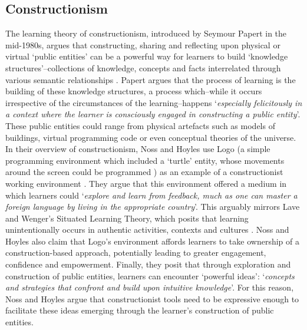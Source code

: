 \documentclass{sigchi}
\begin{document}
\subsection{Constructionism}
The learning theory of constructionism, introduced by Seymour Papert in the mid-1980s, argues that constructing, sharing and reflecting upon physical or virtual `public entities' can be a powerful way for learners to build `knowledge structures'--collections of knowledge, concepts and facts interrelated through various semantic relationships \cite{PapertSeymourandHarel1991a}. Papert argues that the process of learning is the building of these knowledge structures, a process which--while it occurs irrespective of the circumstances of the learning--happens `\textit{especially felicitously in a context where the learner is consciously engaged in constructing a public entity}'. These public entities could range from physical artefacts such as models of buildings, virtual programming code or even conceptual theories of the universe. In their overview of constructionism, Noss and Hoyles use Logo (a simple programming environment which included a `turtle' entity, whose movements around the screen could be programmed \cite{Harvey1997}) as an example of a constructionist working environment \cite{Noss2017}. They argue that this environment offered a medium in which learners could `\textit{explore and learn from feedback, much as one can master a foreign language by living in the appropriate country}'. This arguably mirrors Lave and Wenger's Situated Learning Theory, which posits that learning unintentionally occurs in authentic activities, contexts and cultures \cite{Lave1991}. Noss and Hoyles also claim that Logo's environment affords learners to take ownership of a construction-based approach, potentially leading to greater engagement, confidence and empowerment. Finally, they posit that through exploration and construction of public entities, learners can encounter `powerful ideas': `\textit{concepts and strategies  that confront and build upon intuitive knowledge}'. For this reason, Noss and Hoyles argue that constructionist tools need to be expressive enough to facilitate these ideas emerging through the learner's construction of public entities.
\end{document}
